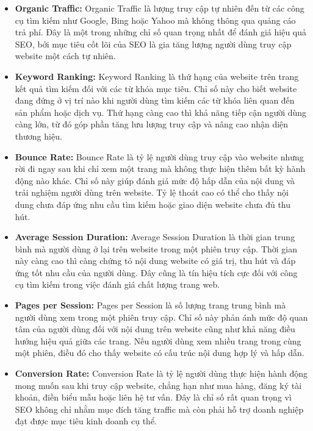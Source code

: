\documentclass[13pt]{article}
\begin{document}
\begin{itemize}
    \item \textbf{Organic Traffic:}
Organic Traffic là lượng truy cập tự nhiên đến từ các công cụ tìm kiếm như Google, Bing hoặc Yahoo mà không thông qua quảng cáo trả phí. Đây là một trong những chỉ số quan trọng nhất để đánh giá hiệu quả SEO, bởi mục tiêu cốt lõi của SEO là gia tăng lượng người dùng truy cập website một cách tự nhiên.

\item \textbf{Keyword Ranking:}
Keyword Ranking là thứ hạng của website trên trang kết quả tìm kiếm đối với các từ khóa mục tiêu. Chỉ số này cho biết website đang đứng ở vị trí nào khi người dùng tìm kiếm các từ khóa liên quan đến sản phẩm hoặc dịch vụ. Thứ hạng càng cao thì khả năng tiếp cận người dùng càng lớn, từ đó góp phần tăng lưu lượng truy cập và nâng cao nhận diện thương hiệu.

\item \textbf{Bounce Rate: }
Bounce Rate là tỷ lệ người dùng truy cập vào website nhưng rời đi ngay sau khi chỉ xem một trang mà không thực hiện thêm bất kỳ hành động nào khác. Chỉ số này giúp đánh giá mức độ hấp dẫn của nội dung và trải nghiệm người dùng trên website. Tỷ lệ thoát cao có thể cho thấy nội dung chưa đáp ứng nhu cầu tìm kiếm hoặc giao diện website chưa đủ thu hút.

\item \textbf{Average Session Duration: }
Average Session Duration là thời gian trung bình mà người dùng ở lại trên website trong một phiên truy cập. Thời gian này càng cao thì càng chứng tỏ nội dung website có giá trị, thu hút và đáp ứng tốt nhu cầu của người dùng. Đây cũng là tín hiệu tích cực đối với công cụ tìm kiếm trong việc đánh giá chất lượng trang web.

\item \textbf{Pages per Session: }
Pages per Session là số lượng trang trung bình mà người dùng xem trong một phiên truy cập. Chỉ số này phản ánh mức độ quan tâm của người dùng đối với nội dung trên website cũng như khả năng điều hướng hiệu quả giữa các trang. Nếu người dùng xem nhiều trang trong cùng một phiên, điều đó cho thấy website có cấu trúc nội dung hợp lý và hấp dẫn.

\item \textbf{Conversion Rate: }
Conversion Rate là tỷ lệ người dùng thực hiện hành động mong muốn sau khi truy cập website, chẳng hạn như mua hàng, đăng ký tài khoản, điền biểu mẫu hoặc liên hệ tư vấn. Đây là chỉ số rất quan trọng vì SEO không chỉ nhằm mục đích tăng traffic mà còn phải hỗ trợ doanh nghiệp đạt được mục tiêu kinh doanh cụ thể.


\end{itemize}
\end{document}
